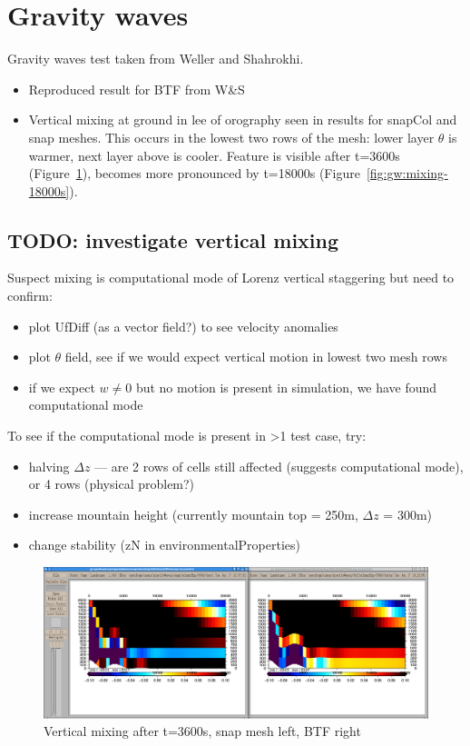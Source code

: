 \section{Gravity waves}

Gravity waves test taken from Weller and Shahrokhi.

\begin{itemize}
\item Reproduced result for BTF from W\&S
\item Vertical mixing at ground in lee of orography seen in results for snapCol and snap meshes.  This occurs in the lowest two rows of the mesh: lower layer $\theta$ is warmer, next layer above is cooler.  Feature is visible after t=3600s (Figure~\ref{fig:gw:mixing-3600s}), becomes more pronounced by t=18000s (Figure~\ref{fig:gw:mixing-18000s}).
\end{itemize}

\subsection{TODO: investigate vertical mixing}
Suspect mixing is computational mode of Lorenz vertical staggering but need to confirm:
\begin{itemize}
\item plot UfDiff (as a vector field?) to see velocity anomalies
\item plot $\theta$ field, see if we would expect vertical motion in lowest two mesh rows
\item if we expect $w \neq 0$ but no motion is present in simulation, we have found computational mode
\end{itemize}

To see if the computational mode is present in >1 test case, try:
\begin{itemize}
\item halving $\Delta z$ --- are 2 rows of cells still affected (suggests computational mode), or 4 rows (physical problem?)
\item increase mountain height (currently mountain top = 250m, $\Delta z$ = 300m)
\item change stability (zN in environmentalProperties)
\end{itemize}

\begin{figure}
\includegraphics[width=\textwidth]{interim-results/gravityWavesBTFsnapMidZoom3600.png}
\caption{Vertical mixing after t=3600s, snap mesh left, BTF right}
\label{fig:gw:mixing-3600s}
\end{figure}


